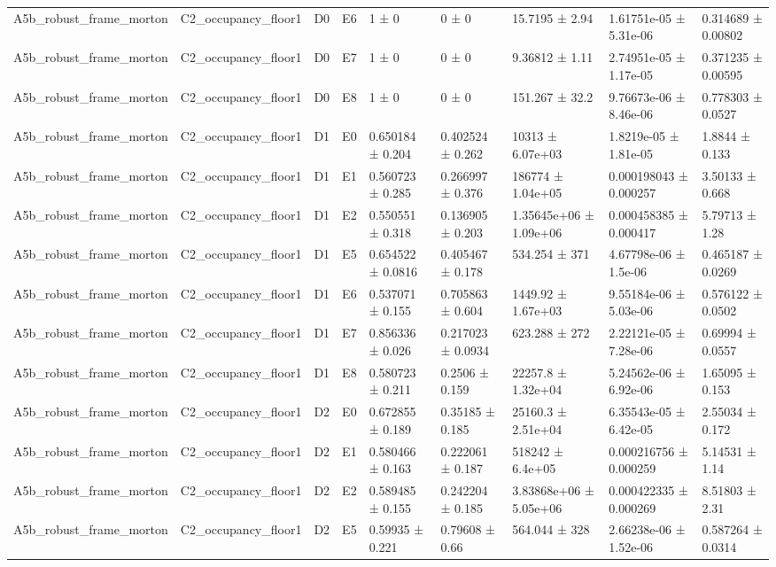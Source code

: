 \begin{table}
\begin{tabular}{lllllllll}
A5b\_robust\_frame\_morton & C2\_occupancy\_floor1 & D0 & E6 & 1 ± 0 & 0 ± 0 & 15.7195 ± 2.94 & 1.61751e-05 ± 5.31e-06 & 0.314689 ± 0.00802 \\
A5b\_robust\_frame\_morton & C2\_occupancy\_floor1 & D0 & E7 & 1 ± 0 & 0 ± 0 & 9.36812 ± 1.11 & 2.74951e-05 ± 1.17e-05 & 0.371235 ± 0.00595 \\
A5b\_robust\_frame\_morton & C2\_occupancy\_floor1 & D0 & E8 & 1 ± 0 & 0 ± 0 & 151.267 ± 32.2 & 9.76673e-06 ± 8.46e-06 & 0.778303 ± 0.0527 \\
A5b\_robust\_frame\_morton & C2\_occupancy\_floor1 & D1 & E0 & 0.650184 ± 0.204 & 0.402524 ± 0.262 & 10313 ± 6.07e+03 & 1.8219e-05 ± 1.81e-05 & 1.8844 ± 0.133 \\
A5b\_robust\_frame\_morton & C2\_occupancy\_floor1 & D1 & E1 & 0.560723 ± 0.285 & 0.266997 ± 0.376 & 186774 ± 1.04e+05 & 0.000198043 ± 0.000257 & 3.50133 ± 0.668 \\
A5b\_robust\_frame\_morton & C2\_occupancy\_floor1 & D1 & E2 & 0.550551 ± 0.318 & 0.136905 ± 0.203 & 1.35645e+06 ± 1.09e+06 & 0.000458385 ± 0.000417 & 5.79713 ± 1.28 \\
A5b\_robust\_frame\_morton & C2\_occupancy\_floor1 & D1 & E5 & 0.654522 ± 0.0816 & 0.405467 ± 0.178 & 534.254 ± 371 & 4.67798e-06 ± 1.5e-06 & 0.465187 ± 0.0269 \\
A5b\_robust\_frame\_morton & C2\_occupancy\_floor1 & D1 & E6 & 0.537071 ± 0.155 & 0.705863 ± 0.604 & 1449.92 ± 1.67e+03 & 9.55184e-06 ± 5.03e-06 & 0.576122 ± 0.0502 \\
A5b\_robust\_frame\_morton & C2\_occupancy\_floor1 & D1 & E7 & 0.856336 ± 0.026 & 0.217023 ± 0.0934 & 623.288 ± 272 & 2.22121e-05 ± 7.28e-06 & 0.69994 ± 0.0557 \\
A5b\_robust\_frame\_morton & C2\_occupancy\_floor1 & D1 & E8 & 0.580723 ± 0.211 & 0.2506 ± 0.159 & 22257.8 ± 1.32e+04 & 5.24562e-06 ± 6.92e-06 & 1.65095 ± 0.153 \\
A5b\_robust\_frame\_morton & C2\_occupancy\_floor1 & D2 & E0 & 0.672855 ± 0.189 & 0.35185 ± 0.185 & 25160.3 ± 2.51e+04 & 6.35543e-05 ± 6.42e-05 & 2.55034 ± 0.172 \\
A5b\_robust\_frame\_morton & C2\_occupancy\_floor1 & D2 & E1 & 0.580466 ± 0.163 & 0.222061 ± 0.187 & 518242 ± 6.4e+05 & 0.000216756 ± 0.000259 & 5.14531 ± 1.14 \\
A5b\_robust\_frame\_morton & C2\_occupancy\_floor1 & D2 & E2 & 0.589485 ± 0.155 & 0.242204 ± 0.185 & 3.83868e+06 ± 5.05e+06 & 0.000422335 ± 0.000269 & 8.51803 ± 2.31 \\
A5b\_robust\_frame\_morton & C2\_occupancy\_floor1 & D2 & E5 & 0.59935 ± 0.221 & 0.79608 ± 0.66 & 564.044 ± 328 & 2.66238e-06 ± 1.52e-06 & 0.587264 ± 0.0314 \\

\end{tabular}
\end{table}
